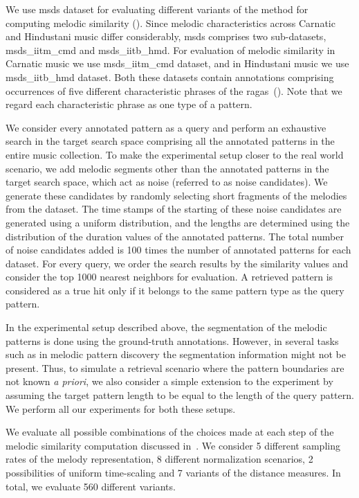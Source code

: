 We use \acrshort{msds} dataset for evaluating different variants of the method for computing melodic similarity (). Since melodic characteristics across Carnatic and Hindustani music differ considerably, \acrshort{msds} comprises two sub-datasets, \acrshort{msds_iitm_cmd} and \acrshort{msds_iitb_hmd}. For evaluation of melodic similarity in Carnatic music we use \acrshort{msds_iitm_cmd} dataset, and in Hindustani music we use \acrshort{msds_iitb_hmd} dataset. Both these datasets contain annotations comprising occurrences of five different characteristic phrases of the \glspl{raga}~(). Note that we regard each characteristic phrase as one type of a pattern.

We consider every annotated pattern as a query and perform an exhaustive search in the target search space comprising all the annotated patterns in the entire music collection. To make the experimental setup closer to the real world scenario, we add melodic segments other than the annotated patterns in the target search space, which act as noise (referred to as noise candidates). We generate these candidates by randomly selecting short fragments of the melodies from the dataset. The time stamps of the starting of these noise candidates are generated using a uniform distribution, and the lengths are determined using the distribution of the duration values of the annotated patterns. The total number of noise candidates added is 100 times the number of annotated patterns for each dataset. For every query, we order the search results by the similarity values and consider the top 1000 nearest neighbors for evaluation. A retrieved pattern is considered as a true hit only if it belongs to the same pattern type as the query pattern. 

In the experimental setup described above, the segmentation of the melodic patterns is done using the ground-truth annotations. However, in several tasks such as in melodic pattern discovery the segmentation information might not be present. Thus, to simulate a retrieval scenario where the pattern boundaries are not known \textit{a priori}, we also consider a simple extension to the experiment by assuming the target pattern length to be equal to the length of the query pattern. We perform all our experiments for both these setups. 

We evaluate all possible combinations of the choices made at each step of the melodic similarity computation discussed in~. We consider 5 different sampling rates of the melody representation, 8 different normalization scenarios, 2 possibilities of uniform time-scaling and 7 variants of the distance measures. In total, we evaluate 560 different variants.

